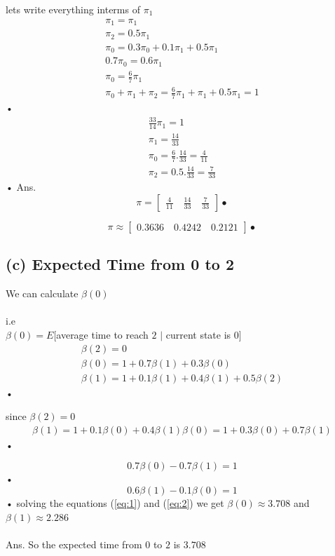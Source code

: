\documentclass[a4paper,11pt]{report}
\begin{document}
lets write everything interms of $\pi_1$\\
\begin{eqnarray}
\pi_1=\pi_1\\
\pi_2=0.5\pi_1\\
\pi_0 = 0.3\pi_0+0.1\pi_1+0.5\pi_1\\
0.7\pi_0=0.6\pi_1\\
\pi_0 = \frac{6}{7}\pi_1\\
\pi_0+\pi_1+\pi_2=\frac{6}{7}\pi_1+\pi_1+0.5\pi_1=1
\end{eqnarray}•
\begin{eqnarray}
\frac{33}{14}\pi_1=1\\
\pi_1=\frac{14}{33}\\
\pi_0=\frac{6}{7}.\frac{14}{33}=\frac{4}{11}\\
\pi_2=0.5.\frac{14}{33}=\frac{7}{33}
\end{eqnarray}•
Ans.
$$
\pi = \begin{bmatrix}
\frac{4}{11} \quad \frac{14}{33}\quad \frac{7}{33}   
\end{bmatrix}•
$$

$$
\pi \approx \begin{bmatrix}
0.3636 \quad 0.4242 \quad   0.2121
\end{bmatrix}•
$$
\subsection*{(c) Expected Time from 0 to 2}

We can calculate $\beta(0)$ \\\\ i.e\\$\beta(0)= E[$average time to reach $2$ $|$ current state is $0] $
\begin{eqnarray}
\beta(2) = 0\\
\beta(0) = 1+0.7\beta(1) + 0.3\beta(0)\\
\beta(1) = 1+0.1\beta(1) +0.4\beta(1) + 0.5\beta(2) 
\end{eqnarray}•

since $\beta(2)=0$
\begin{eqnarray}
\beta(1) = 1+0.1\beta(0) + 0.4\beta(1)
\beta(0) = 1+0.3\beta(0) + 0.7\beta(1)
\end{eqnarray}•

\begin{equation}\label{eq:1}
0.7\beta(0)-0.7\beta(1) = 1
\end{equation}•
\begin{equation}\label{eq:2}
0.6\beta(1)-0.1\beta(0) = 1
\end{equation}•
solving the equations (\ref{eq:1}) and (\ref{eq:2}) we get $\beta(0) \approx 3.708$ and $\beta(1)\approx 2.286$\\\\
Ans.
So the expected time from $0$ to $2$ is $ 3.708$
\end{document}
